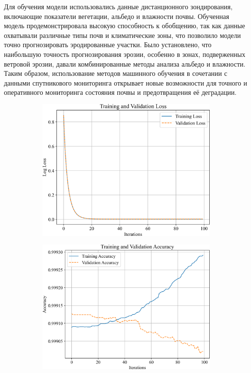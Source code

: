 \begin{multicols}{2}
Для обучения модели использовались данные дистанционного зондирования,
включающие показатели вегетации, альбедо и влажности почвы. Обученная
модель продемонстрировала высокую способность к обобщению, так как
данные охватывали различные типы почв и климатические зоны, что
позволило модели точно прогнозировать эродированные участки. Было
установлено, что наибольшую точность прогнозирования эрозии, особенно в
зонах, подверженных ветровой эрозии, давали комбинированные методы
анализа альбедо и влажности. Таким образом, использование методов
машинного обучения в сочетании с данными спутникового мониторинга
открывает новые возможности для точного и оперативного мониторинга
состояния почвы и предотвращения её деградации.
\end{multicols}

\begin{figure}[H]
   \centering
   \begin{subfigure}{0.45\textwidth}
   	\centering
   	\includegraphics[width=\textwidth, height=0.8\textwidth]{media/ict/image39}
   \end{subfigure}
   \begin{subfigure}{0.45\textwidth}
   	\centering
   	\includegraphics[width=\textwidth, height=0.8\textwidth]{media/ict/image40}

\end{subfigure}
\end{figure}
